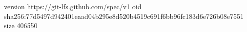 version https://git-lfs.github.com/spec/v1
oid sha256:77d5497d942401eaad04b295e8d520b4519c691f6bb96fc183d6e726b08e7551
size 406550
